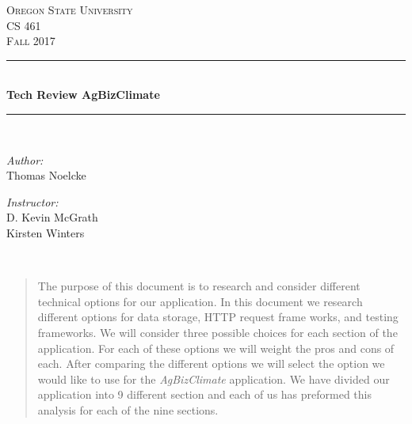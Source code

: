 \documentclass[onecolumn, draftclsnofoot,10pt, compsoc]{article}
\begin{document}
    \begin{titlepage}
    \newcommand{\HRule}{\rule{\linewidth}{0.5mm}}
    \center
    \textsc{\Large Oregon State University}\\[1.5cm]
    \textsc{\Large CS 461}\\[0.5cm]
    \textsc{\Large Fall 2017}\\[0.5cm]
    \HRule \\[0.4cm]
    { \huge \bfseries Tech Review AgBizClimate\textcopyright}\\[0.4cm] %
    \HRule \\[1.5cm]
    \begin{minipage}{0.4\textwidth}
        \begin{flushleft} \large
        \emph{Author:}\\
        Thomas Noelcke
        \end{flushleft}
    \end{minipage}
    \begin{minipage}{0.4\textwidth}
        \begin{flushright} \large
        \emph{Instructor:} \\
        D. Kevin McGrath\\
        Kirsten Winters
        \end{flushright}
    \end{minipage}\\[2cm]
    \begin{abstract}
    \item 
		The purpose of this document is to research and consider different technical options for our application. In this document we research different options for data storage, HTTP request frame works, and testing frameworks. We will consider three possible choices for each section of the application. For each of these options we will weight the pros and cons of each. After comparing the different options we will select the option we would like to use for the \textit{AgBizClimate} application. We have divided our application into 9 different section and each of us has preformed this analysis for each of the nine sections.
    \end{abstract}
    \vfill %
    \end{titlepage}
		\newpage
		\tableofcontents
		\newpage
		\clearpage
		
\end{document}
